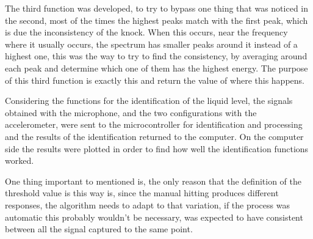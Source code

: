 The third function was developed, to try to bypass one thing that was noticed in the second, most of the times the highest peaks match with the first peak, which is due the inconsistency of the knock. When this occurs, near the frequency where it usually occurs, the spectrum has smaller peaks around it instead of a highest one, this was the way to try to find the consistency, by averaging around each peak and determine which one of them has the highest energy. The purpose of this third function is exactly this and return the value of where this happens.

Considering the functions for the identification of the liquid level, the signals obtained with the microphone, and the two configurations with the accelerometer, were sent to the microcontroller for identification and processing and the results of the identification returned to the computer. On the computer side the results were plotted in order to find how well the identification functions worked. 

One thing important to mentioned is, the only reason that the definition of the threshold value is this way is, since the manual hitting produces different responses, the algorithm needs to adapt to that variation, if the process was automatic this probably wouldn't be necessary, was expected to have consistent between all the signal captured to the same point.   
